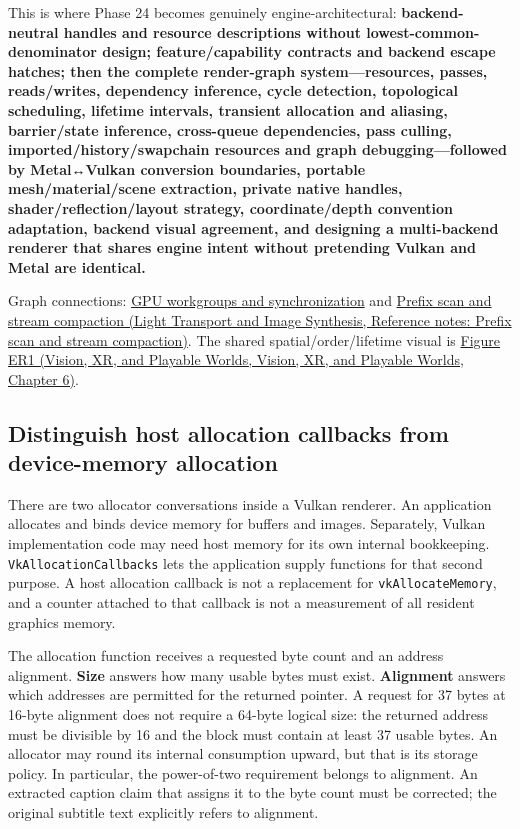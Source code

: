This is where Phase 24 becomes genuinely engine-architectural: \textbf{backend-neutral handles and resource descriptions without lowest-common-denominator design; feature/capability contracts and backend escape hatches; then the complete render-graph system---resources, passes, reads/writes, dependency inference, cycle detection, topological scheduling, lifetime intervals, transient allocation and aliasing, barrier/state inference, cross-queue dependencies, pass culling, imported/history/swapchain resources and graph debugging---followed by Metal↔Vulkan conversion boundaries, portable mesh/material/scene extraction, private native handles, shader/reflection/layout strategy, coordinate/depth convention adaptation, backend visual agreement, and designing a multi-backend renderer that shares engine intent without pretending Vulkan and Metal are identical.}

Graph connections: \hyperref[appendix-f662b5b1773b]{GPU workgroups and synchronization} and \href{../04-Light-Transport-and-Image-Synthesis/main.pdf\#nameddest=appendix-f2ee4d086415}{Prefix scan and stream compaction (Light Transport and Image Synthesis, Reference notes: Prefix scan and stream compaction)}. The shared spatial/order/lifetime visual is \href{../07-Vision-XR-and-Playable-Worlds/main.pdf\#nameddest=04-visual-computing-ii-ch037-figure-er1---footprint-compositing-order-and-storage-lifetime}{Figure ER1 (Vision, XR, and Playable Worlds, Vision, XR, and Playable Worlds, Chapter 6)}.

\subsection{Distinguish host allocation callbacks from device-memory allocation}\label{05-engine-i-ch024-distinguish-host-allocation-callbacks-from-device-memory-allocation}

There are two allocator conversations inside a Vulkan renderer. An application allocates and binds device memory for buffers and images. Separately, Vulkan implementation code may need host memory for its own internal bookkeeping. \texttt{VkAllocationCallbacks} lets the application supply functions for that second purpose. A host allocation callback is not a replacement for \texttt{vkAllocateMemory}, and a counter attached to that callback is not a measurement of all resident graphics memory.

The allocation function receives a requested byte count and an address alignment. \textbf{Size} answers how many usable bytes must exist. \textbf{Alignment} answers which addresses are permitted for the returned pointer. A request for 37 bytes at 16-byte alignment does not require a 64-byte logical size: the returned address must be divisible by 16 and the block must contain at least 37 usable bytes. An allocator may round its internal consumption upward, but that is its storage policy. In particular, the power-of-two requirement belongs to alignment. An extracted caption claim that assigns it to the byte count must be corrected; the original subtitle text explicitly refers to alignment.


